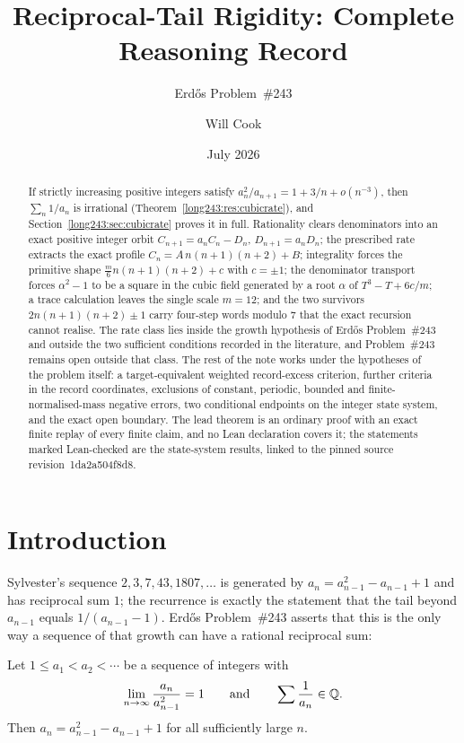 \documentclass[11pt]{article}
\title{Reciprocal-Tail Rigidity: Complete Reasoning Record}
\subtitle{Erd\H{o}s Problem~\#243}
\author{Will Cook}
\date{July 2026}
\renewcommand{\commitshort}{1da2a504f8d8}
\begin{document}
\maketitle
\noteprovenance

\begin{abstract}
\noindent
If strictly increasing positive integers satisfy
$a_n^2/a_{n+1}=1+3/n+o(n^{-3})$, then $\sum_n1/a_n$ is irrational
(Theorem~\ref{long243:res:cubicrate}), and Section~\ref{long243:sec:cubicrate} proves it in
full.  Rationality clears denominators into an exact positive integer orbit
$C_{n+1}=a_nC_n-D_n$, $D_{n+1}=a_nD_n$; the prescribed rate extracts the exact
profile $C_n=A\,n(n+1)(n+2)+B$; integrality forces the primitive shape
$\frac m6n(n+1)(n+2)+c$ with $c=\pm1$; the denominator transport forces
$\alpha^2-1$ to be a square in the cubic field generated by a root $\alpha$ of
$T^3-T+6c/m$; a trace calculation leaves the single scale $m=12$; and the two
survivors $2n(n+1)(n+2)\pm1$ carry four-step words modulo $7$ that the exact
recursion cannot realise.  The rate class lies inside the growth hypothesis of
Erd\H{o}s Problem~\#243 and outside the two sufficient conditions recorded in
the literature, and Problem~\#243 remains open outside that class.  The rest of
the note works under the hypotheses of the problem itself: a target-equivalent
weighted record-excess criterion, further criteria in the record coordinates,
exclusions of constant, periodic, bounded and finite-normalised-mass negative
errors, two conditional endpoints on the integer state system, and the exact
open boundary.  The lead theorem is an ordinary proof with an exact finite
replay of every finite claim, and no Lean declaration covers it; the
statements marked Lean-checked are the state-system results, linked to the
pinned source revision~\commitshort.
\end{abstract}

\section{Introduction}\label{long243:sec:problem}

Sylvester's sequence $2,3,7,43,1807,\ldots$ is generated by
$a_{n}=a_{n-1}^{2}-a_{n-1}+1$ and has reciprocal sum $1$; the recurrence is
exactly the statement that the tail beyond $a_{n-1}$ equals $1/(a_{n-1}-1)$.
Erd\H{o}s Problem~\#243 asserts that this is the only way a sequence of that
growth can have a rational reciprocal sum:

\begin{problem}[Erd\H{o}s \#243]\label{long243:res:problem}
Let $1\le a_1<a_2<\cdots$ be a sequence of integers with
\[
 \lim_{n\to\infty}\frac{a_n}{a_{n-1}^{2}}=1
 \qquad\text{and}\qquad
 \sum\frac{1}{a_n}\in\mathbb{Q} .
\]
Then $a_n=a_{n-1}^{2}-a_{n-1}+1$ for all sufficiently large $n$.
\end{problem}
\end{document}
